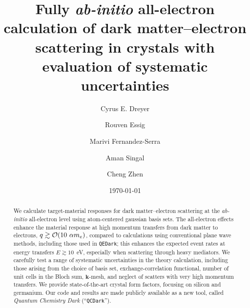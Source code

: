 \documentclass[
    prd, twocolumn, superscriptaddress, nofootinbib, amsmath, amssymb,
    aps, floatfix,preprintnumbers
]{revtex4-2}
\begin{document}
\title{Fully \textit{ab-initio} all-electron calculation of dark matter--electron scattering in crystals with evaluation of systematic uncertainties}
\date{\today}

\author{Cyrus E. Dreyer}

\author{Rouven Essig}

\author{Marivi Fernandez-Serra}

\author{Aman Singal}

\author{Cheng Zhen}


\begin{abstract}
    We calculate target-material responses for dark matter--electron scattering at the \textit{ab-initio} all-electron level using atom-centered gaussian basis sets.  The all-electron effects enhance the material response at high momentum transfers from dark matter to electrons, $q\gtrsim \order{10\ \alpha m_e}$, compared to calculations using conventional plane wave methods, including those used in \texttt{QEDark}; this enhances the expected event rates at energy transfers $E \gtrsim 10$~eV, especially when scattering through heavy mediators.  We carefully test a range of systematic uncertainties in the theory calculation, including those arising from the choice of basis set, exchange-correlation functional, number of unit cells in the Bloch sum, $\mathbf{k}$-mesh, and neglect of scatters with very high momentum transfers.  We provide state-of-the-art crystal form factors, focusing on silicon and germanium.  Our code and results are made publicly available as a new tool, called \textit{Quantum Chemistry Dark} (``\texttt{QCDark}''). 
\end{abstract}
\end{document}
